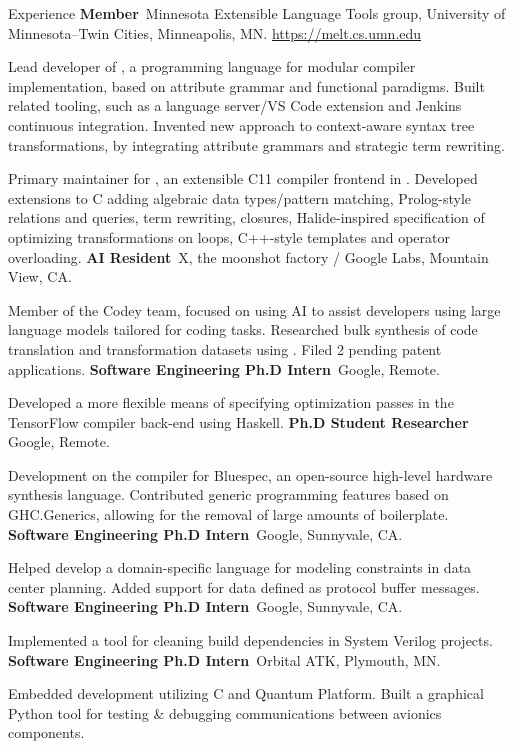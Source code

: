 \begin{rubric}{Experience}
\entry*[2014 -- $\cdots$]%
	\textbf{Member}\, Minnesota Extensible Language Tools group, University of Minnesota--Twin Cities, Minneapolis, MN.
	\url{https://melt.cs.umn.edu}
	\par Lead developer of \silver{}, a programming language for modular compiler
	implementation, based on attribute grammar and functional paradigms.
	Built related tooling, such as a language server/VS Code extension and Jenkins continuous integration.
	Invented new approach to context-aware syntax tree transformations, by integrating attribute grammars and strategic term rewriting.
	\par Primary maintainer for \ableC{}, an extensible C11 compiler frontend in \silver{}.
	Developed extensions to C adding algebraic data types/pattern matching, Prolog-style relations and queries,
	term rewriting, closures, Halide-inspired specification of optimizing transformations on loops, C++-style templates and operator overloading.
%
\entry*[2021 -- 2023]%
	\textbf{AI Resident}\, X, the moonshot factory / Google Labs, Mountain View, CA.
	\par Member of the Codey team, focused on using AI to assist developers using large language models tailored for coding tasks.
	Researched bulk synthesis of code translation and transformation datasets using \silver{}.
	Filed 2 pending patent applications.
%
\entry*[2021]%
	\textbf{Software Engineering Ph.D Intern}\, Google, Remote.
	\par Developed a more flexible means of specifying optimization passes in the TensorFlow compiler back-end using Haskell.
%
\entry*[2020 -- 2021]%
	\textbf{Ph.D Student Researcher}\, Google, Remote.
	\par Development on the compiler for Bluespec, an open-source high-level hardware synthesis language.
	Contributed generic programming features based on GHC.Generics, allowing for the removal of large amounts of boilerplate.
%
\entry*[2019]%
	\textbf{Software Engineering Ph.D Intern}\, Google, Sunnyvale, CA.
	\par Helped develop a domain-specific language for modeling constraints in data center planning.
	Added support for data defined as protocol buffer messages.
%
\entry*[2018]%
	\textbf{Software Engineering Ph.D Intern}\, Google, Sunnyvale, CA.
	\par Implemented a tool for cleaning build dependencies in System Verilog projects.
%
\entry*[2017]%
	\textbf{Software Engineering Ph.D Intern}\, Orbital ATK, Plymouth, MN.
	\par Embedded development utilizing C and Quantum Platform.
	Built a graphical Python tool for testing \& debugging communications between avionics components.
%
\end{rubric}